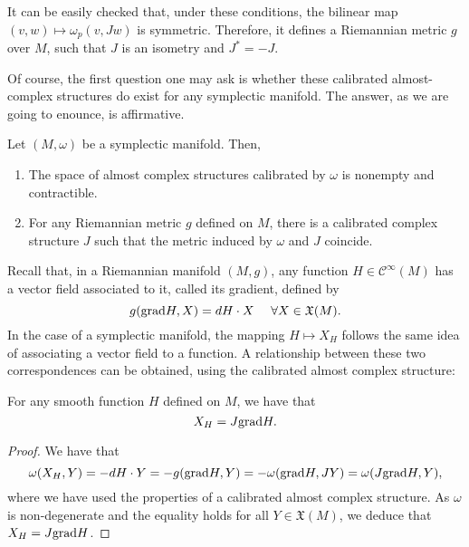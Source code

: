 It can be easily checked that, under these conditions, the bilinear map $(v,w) \mapsto \omega_p(v,Jw)$ is symmetric. Therefore, it defines a Riemannian metric $g$ over $M$, such that $J$ is an isometry and $J^{\ast} = - J$.

Of course, the first question one may ask is whether these calibrated almost-complex structures do exist for any symplectic manifold. The answer, as we are going to enounce, is affirmative.

\begin{prop} Let $(M,\omega)$ be a symplectic manifold. Then,

\begin{enumerate}
	\item The space of almost complex structures calibrated by $\omega$ is nonempty and contractible.
	\item For any Riemannian metric $g$ defined on $M$, there is a calibrated complex structure $J$ such that the metric induced by $\omega$ and $J$ coincide.
\end{enumerate}
\end{prop}

Recall that, in a Riemannian manifold $(M,g)$, any function $H \in \mathcal{C}^{\infty}(M)$ has a vector field associated to it, called its gradient, defined by
\[g(\mathrm{grad} H, X) = d H \cdot X \ \ \ \ \forall X \in \mathfrak{X}(M) .\]
In the case of a symplectic manifold, the mapping $H \mapsto X_H$ follows the same idea of associating a vector field to a function. A relationship between these two correspondences can be obtained, using the calibrated almost complex structure:

\begin{prop} \label{prop:symplectic_gradient}
For any smooth function $H$ defined on $M$, we have that
\[X_H = J \mathrm{grad} H .\]
\end{prop}

\begin{proof}
We have that
\[\omega(X_H,Y) = - d H \cdot Y = - g(\mathrm{grad} H,Y) = - \omega(\mathrm{grad} H,JY) = \omega(J \mathrm{grad} H, Y) ,\]
where we have used the properties of a calibrated almost complex structure. As $\omega$ is non-degenerate and the equality holds for all $Y \in \mathfrak{X}(M)$, we deduce that $X_H = J \mathrm{grad} H$.
\end{proof}

